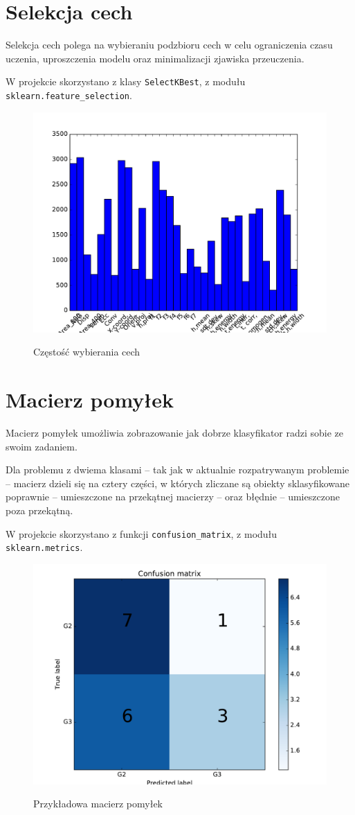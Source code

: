 \newpage

\section{Selekcja cech}
Selekcja cech polega na wybieraniu podzbioru cech w celu ograniczenia czasu uczenia, uproszczenia modelu oraz minimalizacji zjawiska przeuczenia.

W projekcie skorzystano z klasy \texttt{SelectKBest}, z modułu \texttt{sklearn.feature\_selection}.
\begin{figure}[h!]
	\centering
	\includegraphics[width=1.0\linewidth]{img/features.pdf}
	\label{Rysunek}
	\caption{Częstość wybierania cech}
\end{figure}

\newpage

\section{Macierz pomyłek}
Macierz pomyłek umożliwia zobrazowanie jak dobrze klasyfikator radzi sobie ze swoim zadaniem.

Dla problemu z dwiema klasami -- tak jak w aktualnie rozpatrywanym problemie -- macierz dzieli się na cztery części, w których zliczane są obiekty sklasyfikowane poprawnie -- umieszczone na przekątnej macierzy -- oraz błędnie -- umieszczone poza przekątną.

W projekcie skorzystano z funkcji \texttt{confusion\_matrix}, z modułu \texttt{sklearn.metrics}.
\begin{figure}[h!]
	\centering
	\includegraphics[width=1.0\linewidth]{img/conf_matrix.pdf}
	\label{Rysunek}
	\caption{Przykładowa macierz pomyłek}
\end{figure}